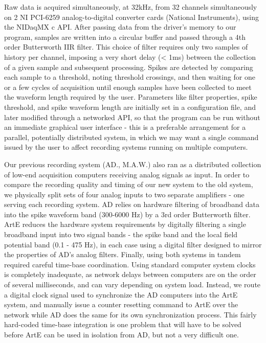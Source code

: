 \documentclass[]{article}
\begin{document}
Raw data is acquired simultaneously, at 32kHz, from 32 channels
simultaneously on 2 NI PCI-6259 analog-to-digital converter cards
(National Instruments), using the NIDaqMX c API. After passing data from
the driver's memory to our program, samples are written into a circular
buffer and passed through a 4th order Butterworth IIR filter. This
choice of filter requires only two samples of history per channel,
imposing a very short delay (\textless{} 1ms) between the collection of
a given sample and subsequent processing. Spikes are detected by
comparing each sample to a threshold, noting threshold crossings, and
then waiting for one or a few cycles of acquisition until enough samples
have been collected to meet the waveform length required by the user.
Parameters like filter properties, spike threshold, and spike waveform
length are initially set in a configuration file, and later modified
through a networked API, so that the program can be run without an
immediate graphical user interface - this is a preferable arrangement
for a parallel, potentially distributed system, in which we may want a
single command issued by the user to affect recording systems running on
multiple computers.

Our previous recording system (AD., M.A.W.) also ran as a distributed
collection of low-end acquisition computers receiving analog signals as
input. In order to compare the recording quality and timing of our new
system to the old system, we physically split sets of four analog inputs
to two separate amplifiers - one serving each recording system. AD
relies on hardware filtering of broadband data into the spike waveform
band (300-6000 Hz) by a 3rd order Butterworth filter. ArtE reduces the
hardware system requirements by digitally filtering a single broadband
input into two signal bands - the spike band and the local field
potential band (0.1 - 475 Hz), in each case using a digital filter
designed to mirror the properties of AD's analog filters. Finally, using
both systems in tandem required careful time-base coordination. Using
standard computer system clocks is completely inadequate, as network
delays between computers are on the order of several milliseconds, and
can vary depending on system load. Instead, we route a digital clock
signal used to synchronize the AD computers into the ArtE system, and
manually issue a counter resetting command to ArtE over the network
while AD does the same for its own synchronization process. This fairly
hard-coded time-base integration is one problem that will have to be
solved before ArtE can be used in isolation from AD, but not a very
difficult one.
\end{document}
